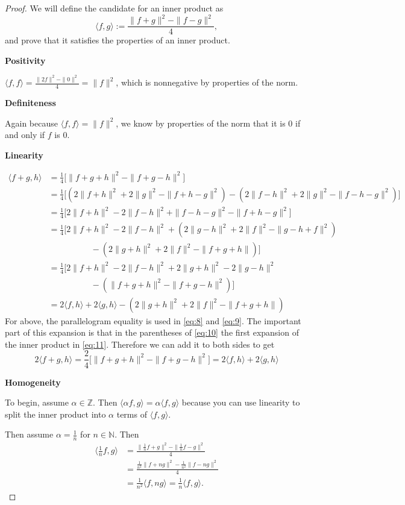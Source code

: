 \documentclass[12pt]{amsart}
\newcommand{\N}{\mathbb{N}}
\newcommand{\Z}{\mathbb{Z}}
\newcommand{\eq}[1]{\begin{equation*}#1\end{equation*}}
\newcommand{\al}[1]{\begin{align*}#1\end{align*}}
\newcommand{\qal}[1]{\begin{align}#1\end{align}}
\newcommand{\<}{\langle}
\renewcommand{\>}{\rangle}
\renewcommand{\-}[1]{\overline{#1}}
\begin{document}
\begin{proof}
    We will define the candidate for an inner product as 
    \eq{\<f, g\> := \frac{\|f+g\|^2 - \|f-g\|^2}{4},}
    and prove that it satisfies the properties of an inner product.

    \textbf{Positivity}
    
    $\<f, f\> = \frac{\|2f\|^2 - \|0\|^2}{4} = \|f\|^2$, which is nonnegative by properties of the norm.

    \textbf{Definiteness}

    Again because $\<f, f\> = \|f\|^2$, we know by properties of the norm that it is $0$ if and only if $f$ is 0.

    \textbf{Linearity}

    \qal{\<f+g, h\> &= \frac{1}{4}\big[ \|f+g+h\|^2 - \|f+g-h\|^2\big] \label{eq:11}\\
        &= \frac{1}{4} \big[(2\|f+h\|^2 + 2\|g\|^2 - \|f+h-g\|^2) - ( 2\|f-h\|^2 +2\|g\|^2 - \|f-h-g\|^2)\big] \label{eq:8}\\
        &=\frac{1}{4}\big[ 2\|f+h\|^2 - 2\|f - h\|^2 + \|f - h - g\|^2 - \|f + h - g\|^2\big] \nonumber\\
        &=\frac{1}{4} \big[2\|f+h\|^2 - 2\|f - h\|^2 + (2\|g-h\|^2 + 2\|f\|^2 -\|g-h+f\|^2) \label{eq:9}\\
        &\hspace{5em}-(2\|g+h\|^2 +2\|f\|^2 - \|f+g+h\|)\big] \nonumber\\
        &= \frac{1}{4}\big[ 2\|f+h\|^2-2\|f-h\|^2+2\|g+h\|^2-2\|g-h\|^2 \nonumber\\
        &\hspace{5em}-(\|f+g+h\|^2-\|f+g-h\|^2)\big] \nonumber \\
        &= 2\<f, h\> + 2\<g, h\> - (2\|g+h\|^2 +2\|f\|^2 - \|f+g+h\|) \label{eq:10}}
    For above, the parallelogram equality is used in \eqref{eq:8} and \eqref{eq:9}. The important part of this expansion is that in the parentheses of \eqref{eq:10} the first expansion of the inner product in \eqref{eq:11}. Therefore we can add it to both sides to get 
    \eq{2\<f+g, h\> = \frac{2}{4} \big[\|f+g+h\|^2-\|f+g-h\|^2\big] = 2\<f,h\> +2\<g,h\>}

    \textbf{Homogeneity}
    
    To begin, assume $\alpha \in \Z$. Then $\<\alpha f, g\> = \alpha \<f, g\>$ because you can use linearity to split the inner product into $\alpha$ terms of $\<f, g\>$.

    Then assume $\alpha = \frac{1}{n}$ for $n \in \N$. Then 
    \al{\<\frac{1}{n} f, g\> &= \frac{\|\frac{1}{n} f + g\|^2 - \|\frac{1}{n} f - g\|^2}{4} \\
        &= \frac{\frac{1}{n^2} \|f+ng\|^2 - \frac{1}{n^2} \|f - ng\|^2}{4} \\
        &=\frac{1}{n^2} \<f, ng\> = \frac{1}{n} \<f, g\>.}


\end{proof}
\end{document}

